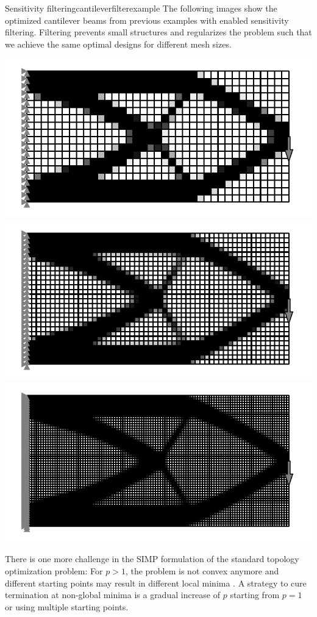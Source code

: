 \begin{example}{Sensitivity filtering}{cantileverfilterexample}
    The following images show the optimized cantilever beams from previous examples with enabled sensitivity filtering. Filtering prevents small structures and regularizes the problem such that we achieve the same optimal designs for different mesh sizes.
    \begin{center}
        \includegraphics[width=0.7\linewidth]{figures/cantilever_fem_optimized_binary_filtered.pdf}
        \includegraphics[width=0.7\linewidth]{figures/cantilever_fem_optimized_binary_fine_filtered.pdf}
        \includegraphics[width=0.7\linewidth]{figures/cantilever_fem_optimized_binary_extra_fine_filtered.pdf}
    \end{center}
\end{example}

There is one more challenge in the SIMP formulation of the standard topology optimization problem: For $p>1$, the problem is not convex anymore and different starting points may result in different local minima \cite{Christensen2008}. A strategy to cure termination at non-global minima is a gradual increase of $p$ starting from $p=1$ or using multiple starting points.

